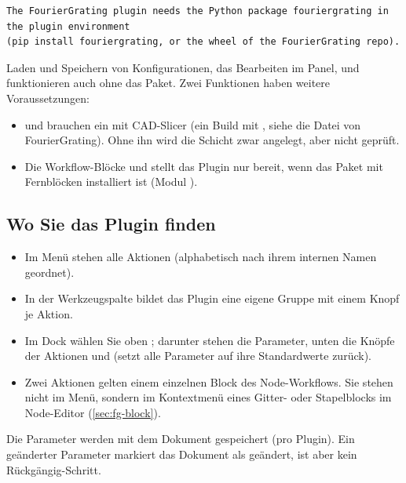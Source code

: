 \begin{lstlisting}
The FourierGrating plugin needs the Python package fouriergrating in the plugin environment
(pip install fouriergrating, or the wheel of the FourierGrating repo).
\end{lstlisting}

Laden und Speichern von Konfigurationen, das Bearbeiten im Panel,  und
 funktionieren auch ohne das Paket. Zwei Funktionen haben weitere
Voraussetzungen:

\begin{itemize}
  \item {} und  brauchen ein 
    mit CAD-Slicer (ein Build mit , siehe die Datei 
    von FourierGrating). Ohne ihn wird die Schicht zwar angelegt, aber nicht geprüft.
  \item Die Workflow-Blöcke  und  stellt das Plugin nur bereit,
    wenn das Paket  mit Fernblöcken installiert ist (Modul
    ).
\end{itemize}

\subsection{Wo Sie das Plugin finden}

\begin{itemize}
  \item Im Menü  stehen alle Aktionen (alphabetisch nach ihrem
    internen Namen geordnet).
  \item In der Werkzeugspalte bildet das Plugin eine eigene Gruppe  mit einem
    Knopf je Aktion.
  \item Im Dock  wählen Sie oben ; darunter stehen die Parameter,
    unten die Knöpfe der Aktionen und  (setzt alle Parameter auf ihre
    Standardwerte zurück).
  \item Zwei Aktionen gelten einem einzelnen Block des Node-Workflows. Sie stehen nicht im Menü,
    sondern im Kontextmenü eines Gitter- oder Stapelblocks im Node-Editor
    (\autoref{sec:fg-block}).
\end{itemize}

Die Parameter werden mit dem Dokument gespeichert (pro Plugin). Ein geänderter Parameter markiert
das Dokument als geändert, ist aber kein Rückgängig-Schritt.

